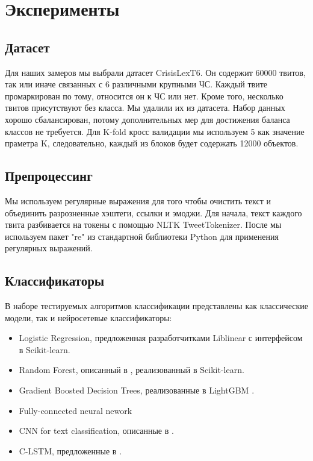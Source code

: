 
\section{Эксперименты}
\subsection{Датасет}
Для наших замеров мы выбрали датасет CrisisLexT6. Он содержит 60000 твитов, так или иначе связанных с 6 различными крупными ЧС. Каждый твите промаркирован по тому, относится он к ЧС или нет. Кроме того, несколько твитов присутствуют без класса. Мы удалили их из датасета. Набор данных хорошо сбалансирован, потому дополнительных мер для достижения баланса классов не требуется. Для K-fold кросс валидации мы используем 5 как значение праметра K, следовательно, каждый из блоков будет содержать 12000 объектов.

\subsection{Препроцессинг}
Мы используем регулярные выражения для того чтобы очистить текст и объединить разрозненные хэштеги, ссылки и эмоджи. Для начала, текст каждого твита разбивается на токены с помощью NLTK TweetTokenizer. После мы используем пакет "re" из стандартной библиотеки Python для применения регулярных выражений.

\subsection{Классификаторы}
В наборе тестируемых алгоритмов классификации представлены как классические модели, так и нейросетевые классификаторы:
\begin{itemize}
	\item Logistic Regression, предложенная разработчитками Liblinear \cite{liblinear} с интерфейсом в Scikit-learn.
	\item Random Forest, описанный в \cite{randomforest}, реализованный в Scikit-learn.
	\item Gradient Boosted Decision Trees, реализованные в LightGBM \cite{lightgbm}.
	\item Fully-connected neural nework
	\item CNN for text classification, описанные в \cite{cnn}.
	\item C-LSTM, предложенные в \cite{clstm}.
\end{itemize}

